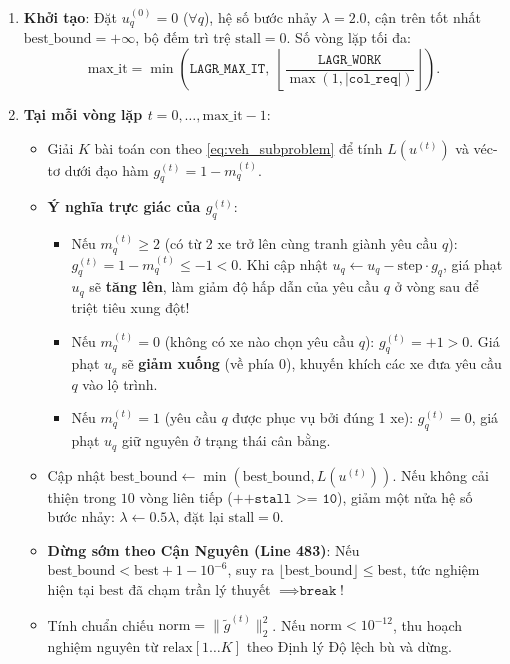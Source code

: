 \documentclass[11pt,a4paper]{article}
\theoremstyle{definition}
\begin{document}
\begin{enumerate}[leftmargin=1.5em]
    \item \textbf{Khởi tạo}: Đặt $u^{(0)}_q = 0$ ($\forall q$), hệ số bước nhảy $\lambda = 2.0$, cận trên tốt nhất $\text{best\_bound} = +\infty$, bộ đếm trì trệ $\text{stall} = 0$. Số vòng lặp tối đa:
    \[
        \text{max\_it} = \min\left( \texttt{LAGR\_MAX\_IT}, \; \left\lfloor \frac{\texttt{LAGR\_WORK}}{\max(1, |\texttt{col\_req}|)} \right\rfloor \right).
    \]
    \item \textbf{Tại mỗi vòng lặp $t = 0, \dots, \text{max\_it}-1$}:
    \begin{itemize}[leftmargin=1.2em]
        \item Giải $K$ bài toán con theo \eqref{eq:veh_subproblem} để tính $L(u^{(t)})$ và véc-tơ dưới đạo hàm $g^{(t)}_q = 1 - m^{(t)}_q$.
        \item \textbf{Ý nghĩa trực giác của $g^{(t)}_q$}:
        \begin{itemize}
            \item Nếu $m^{(t)}_q \ge 2$ (có từ 2 xe trở lên cùng tranh giành yêu cầu $q$): $g^{(t)}_q = 1 - m^{(t)}_q \le -1 < 0$. Khi cập nhật $u_q \leftarrow u_q - \text{step} \cdot g_q$, giá phạt $u_q$ sẽ \textbf{tăng lên}, làm giảm độ hấp dẫn của yêu cầu $q$ ở vòng sau để triệt tiêu xung đột!
            \item Nếu $m^{(t)}_q = 0$ (không có xe nào chọn yêu cầu $q$): $g^{(t)}_q = +1 > 0$. Giá phạt $u_q$ sẽ \textbf{giảm xuống} (về phía $0$), khuyến khích các xe đưa yêu cầu $q$ vào lộ trình.
            \item Nếu $m^{(t)}_q = 1$ (yêu cầu $q$ được phục vụ bởi đúng 1 xe): $g^{(t)}_q = 0$, giá phạt $u_q$ giữ nguyên ở trạng thái cân bằng.
        \end{itemize}
        \item Cập nhật $\text{best\_bound} \leftarrow \min(\text{best\_bound}, L(u^{(t)}))$. Nếu không cải thiện trong $10$ vòng liên tiếp ($\texttt{++stall >= 10}$), giảm một nửa hệ số bước nhảy: $\lambda \leftarrow 0.5\lambda$, đặt lại $\text{stall} = 0$.
        \item \textbf{Dừng sớm theo Cận Nguyên (Line 483)}: Nếu $\text{best\_bound} < \text{best} + 1 - 10^{-6}$, suy ra $\lfloor \text{best\_bound} \rfloor \le \text{best}$, tức nghiệm hiện tại $\text{best}$ đã chạm trần lý thuyết $\implies \texttt{break}$!
        \item Tính chuẩn chiếu $\text{norm} = \|\tilde{g}^{(t)}\|_2^2$. Nếu $\text{norm} < 10^{-12}$, thu hoạch nghiệm nguyên từ $\text{relax}[1\dots K]$ theo Định lý Độ lệch bù và dừng.

\end{itemize}
\end{enumerate}
\end{document}
